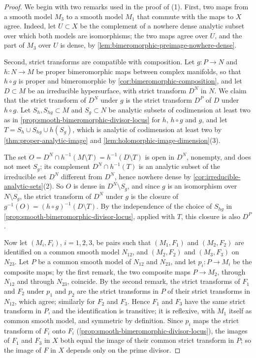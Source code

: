 \begin{proof}
We begin with two remarks used in the proof of (1). First, two maps from a smooth model $M_3$ to a smooth model $M_1$ that commute with the maps to $X$ agree. Indeed, let $U\subset X$ be the complement of a nowhere dense analytic subset over which both models are isomorphisms; the two maps agree over $U$, and the part of $M_3$ over $U$ is dense, by \cref{lem:bimeromorphic-preimage-nowhere-dense}.

Second, strict transforms are compatible with composition. Let $g\colon P\to N$ and $h\colon N\to M$ be proper bimeromorphic maps between complex manifolds, so that $h\circ g$ is proper and bimeromorphic by \cref{cor:bimeromorphic-composition}, and let $D\subset M$ be an irreducible hypersurface, with strict transform $D^N$ in $N$. We claim that the strict transform of $D^N$ under $g$ is the strict transform $D^P$ of $D$ under $h\circ g$. Let $S_h,S_{hg}\subset M$ and $S_g\subset N$ be analytic subsets of codimension at least two as in \cref{prop:smooth-bimeromorphic-divisor-locus} for $h$, $h\circ g$ and $g$, and let $T=S_h\cup S_{hg}\cup h(S_g)$, which is analytic of codimension at least two by \cref{thm:proper-analytic-image} and \cref{lem:holomorphic-image-dimension}(3).

The set $O=D^N\cap h^{-1}(M\setminus T)=h^{-1}(D\setminus T)$ is open in $D^N$, nonempty, and does not meet $S_g$; its complement $D^N\cap h^{-1}(T)$ is an analytic subset of the irreducible set $D^N$ different from $D^N$, hence nowhere dense by \cref{cor:irreducible-analytic-sets}(2). So $O$ is dense in $D^N\setminus S_g$, and since $g$ is an isomorphism over $N\setminus S_g$, the strict transform of $D^N$ under $g$ is the closure of $g^{-1}(O)=(h\circ g)^{-1}(D\setminus T)$. By the independence of the choice of $S_{hg}$ in \cref{prop:smooth-bimeromorphic-divisor-locus}, applied with $T$, this closure is also $D^P$.

Now let $(M_i,F_i)$, $i=1,2,3$, be pairs such that $(M_1,F_1)$ and $(M_2,F_2)$ are identified on a common smooth model $N_{12}$, and $(M_2,F_2)$ and $(M_3,F_3)$ on $N_{23}$. Let $P$ be a common smooth model of $N_{12}$ and $N_{23}$, and let $p_i\colon P\to M_i$ be the composite maps; by the first remark, the two composite maps $P\to M_2$, through $N_{12}$ and through $N_{23}$, coincide. By the second remark, the strict transforms of $F_1$ and $F_2$ under $p_1$ and $p_2$ are the strict transforms in $P$ of their strict transforms in $N_{12}$, which agree; similarly for $F_2$ and $F_3$. Hence $F_1$ and $F_3$ have the same strict transform in $P$, and the identification is transitive; it is reflexive, with $M_1$ itself as common smooth model, and symmetric by definition. Since $p_i$ maps the strict transform of $F_i$ onto $F_i$ (\cref{prop:smooth-bimeromorphic-divisor-locus}), the images of $F_1$ and $F_3$ in $X$ both equal the image of their common strict transform in $P$; so the image of $F$ in $X$ depends only on the prime divisor.


\end{proof}
